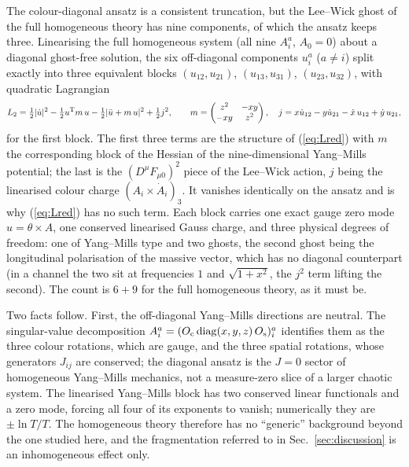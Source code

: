 \documentclass[11pt,a4paper]{article}
\begin{document}
The colour-diagonal ansatz is a consistent truncation, but the Lee--Wick ghost of the full
homogeneous theory has nine components, of which the ansatz keeps three. Linearising the full
homogeneous system (all nine $A^a_i$, $A_0=0$) about a diagonal ghost-free solution, the six
off-diagonal components $u^a_i$ ($a\ne i$) split exactly into three equivalent blocks
$(u_{12},u_{21})$, $(u_{13},u_{31})$, $(u_{23},u_{32})$, with quadratic Lagrangian
\begin{equation}
L_2=\tfrac12|\dot u|^2-\tfrac12u^{\rm T}m\,u-\tfrac12|\ddot u+m\,u|^2+\tfrac12j^2,\qquad
m=\begin{pmatrix}z^2&-xy\\-xy&z^2\end{pmatrix},\quad
j=x\dot u_{12}-y\dot u_{21}-\dot x\,u_{12}+\dot y\,u_{21},
\label{eq:L2}
\end{equation}
for the first block. The first three terms are the structure of (\ref{eq:Lred}) with $m$ the
corresponding block of the Hessian of the nine-dimensional Yang--Mills potential; the last is
the $(D^\mu F_{\mu0})^2$ piece of the Lee--Wick action, $j$ being the linearised colour charge
$(A_i\times\dot A_i)_3$. It vanishes identically on the ansatz and is why (\ref{eq:Lred}) has no
such term. Each block carries one exact gauge zero mode $u=\theta\times A$, one conserved
linearised Gauss charge, and three physical degrees of freedom: one of Yang--Mills type and two
ghosts, the second ghost being the longitudinal polarisation of the massive vector, which has no
diagonal counterpart (in a channel the two sit at frequencies $1$ and $\sqrt{1+x^2}$, the $j^2$
term lifting the second). The count is $6+9$ for the full homogeneous theory, as it must be.

Two facts follow. First, the off-diagonal Yang--Mills directions are neutral. The singular-value
decomposition $A^a_i=(O_{\rm c}\,{\rm diag}(x,y,z)\,O_{\rm s})^a_i$ identifies them as the three
colour rotations, which are gauge, and the three spatial rotations, whose generators $J_{ij}$ are
conserved; the diagonal ansatz is the $J=0$ sector of homogeneous Yang--Mills mechanics, not a
measure-zero slice of a larger chaotic system. The linearised Yang--Mills block has two conserved
linear functionals and a zero mode, forcing all four of its exponents to vanish; numerically they
are $\pm\ln T/T$. The homogeneous theory therefore has no ``generic'' background beyond the one
studied here, and the fragmentation referred to in Sec.~\ref{sec:discussion} is an inhomogeneous
effect only.
\end{document}
